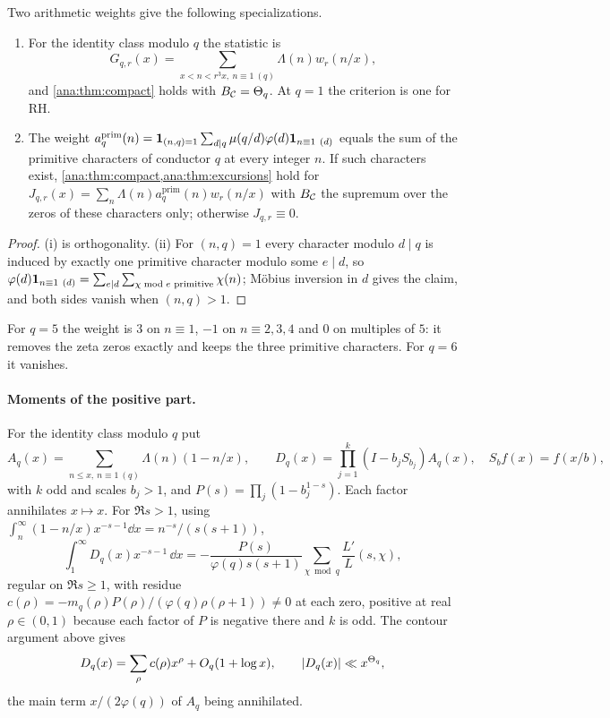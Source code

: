 \begin{corollary}\label{ana:cor:conductor}
Two arithmetic weights give the following specializations.
\begin{enumerate}[label=\textup{(\roman*)}]
\item For the identity class modulo $q$ the statistic is
 \[
  G_{q,r}(x)=\sum_{x<n<r^3x,\ n\equiv1\ (q)}\Lambda(n)w_r(n/x),
 \]
 and \cref{ana:thm:compact} holds with $B_{\mathcal{C}}=\Theta_q$. At $q=1$ the criterion is one for RH.
\item The weight
 $a_q^{\mathrm{prim}}(n)=\mathbf{1}_{(n,q)=1}\sum_{d\mid q}\mu(q/d)\varphi(d)\mathbf{1}_{n\equiv1\ (d)}$
 equals the sum of the primitive characters of conductor $q$ at every integer $n$. If such
 characters exist, \cref{ana:thm:compact,ana:thm:excursions} hold for
 $J_{q,r}(x)=\sum_n\Lambda(n)a_q^{\mathrm{prim}}(n)w_r(n/x)$ with $B_{\mathcal{C}}$ the supremum over
 the zeros of these characters only; otherwise $J_{q,r}\equiv0$.
\end{enumerate}
\end{corollary}

\begin{proof}
(i) is orthogonality. (ii) For $(n,q)=1$ every character modulo $d\mid q$ is induced by
exactly one primitive character modulo some $e\mid d$, so
$\varphi(d)\anaone_{n\equiv1\ (d)}=\sum_{e\mid d}\sum_{\chi\bmod e\text{ primitive}}\chi(n)$;
M\"obius inversion in $d$ gives the claim, and both sides vanish when $(n,q)>1$.
\end{proof}

For $q=5$ the weight is $3$ on $n\equiv1$, $-1$ on $n\equiv2,3,4$ and $0$ on multiples of $5$:
it removes the zeta zeros exactly and keeps the three primitive characters. For $q=6$ it
vanishes.

\paragraph{Moments of the positive part.}
For the identity class modulo $q$ put
\[
 A_q(x)=\sum_{n\le x,\ n\equiv1\ (q)}\Lambda(n)(1-n/x),\qquad
 D_q(x)=\prod_{j=1}^k(I-b_jS_{b_j})A_q(x),\quad S_bf(x)=f(x/b),
\]
with $k$ odd and scales $b_j>1$, and $P(s)=\prod_j(1-b_j^{1-s})$. Each factor annihilates
$x\mapsto x$. For $\Re s>1$, using $\int_n^\infty(1-n/x)x^{-s-1}\dd x=n^{-s}/(s(s+1))$,
\begin{equation}\label{ana:eq:Dq}
 \int_1^\infty D_q(x)x^{-s-1}\,\dd x=-\frac{P(s)}{\varphi(q)s(s+1)}\sum_{\chi\bmod q}\frac{L'}L(s,\chi),
\end{equation}
regular on $\Re s\ge1$, with residue $c(\rho)=-m_q(\rho)P(\rho)/(\varphi(q)\rho(\rho+1))\ne0$ at
each zero, positive at real $\rho\in(0,1)$ because each factor of $P$ is negative there and
$k$ is odd. The contour argument above gives
\begin{equation}\label{ana:eq:Dqef}
 D_q(x)=\sum_\rho c(\rho)x^\rho+O_q(1+\log x),\qquad\lvert D_q(x)\rvert\ll x^{\Theta_q},
\end{equation}
the main term $x/(2\varphi(q))$ of $A_q$ being annihilated.

